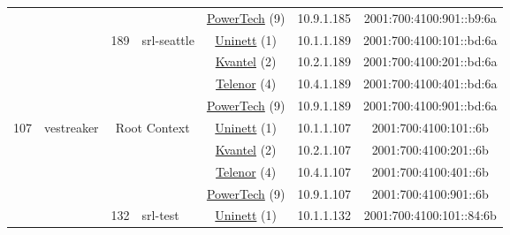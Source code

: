 \begin{small}
\begin{center}
\begin{longtable}{|c|c|c|c|c|c|c|c|}
  &  &  &  & \multicolumn{2}{|c|}{\tiny{\href{http://www.powertech.no}{PowerTech} (9)}} & \tiny{10.9.1.185} & \tiny{2001:700:4100:901::b9:6a} \\* \cline{3-3}\cline{4-4}\cline{5-5}\cline{6-6}\cline{7-7}\cline{8-8}
  &  & \multirow{4}{*}{\tiny{189}} & \multicolumn{1}{|l|}{\multirow{4}{*}{\tiny{srl-seattle}}} & \multicolumn{2}{|c|}{\tiny{\href{https://www.uninett.no}{Uninett} (1)}} & \tiny{10.1.1.189} & \tiny{2001:700:4100:101::bd:6a} \\* \cline{5-5}\cline{6-6}\cline{7-7}\cline{8-8}
  &  &  &  & \multicolumn{2}{|c|}{\tiny{\href{http://kvantel.no}{Kvantel} (2)}} & \tiny{10.2.1.189} & \tiny{2001:700:4100:201::bd:6a} \\* \cline{5-5}\cline{6-6}\cline{7-7}\cline{8-8}
  &  &  &  & \multicolumn{2}{|c|}{\tiny{\href{https://www.telenor.no}{Telenor} (4)}} & \tiny{10.4.1.189} & \tiny{2001:700:4100:401::bd:6a} \\* \cline{5-5}\cline{6-6}\cline{7-7}\cline{8-8}
  &  &  &  & \multicolumn{2}{|c|}{\tiny{\href{http://www.powertech.no}{PowerTech} (9)}} & \tiny{10.9.1.189} & \tiny{2001:700:4100:901::bd:6a} \\ \hline
 \multirow{20}{*}{\tiny{107}} & \multicolumn{1}{|l|}{\multirow{20}{*}{\tiny{vestreaker}}} & \multicolumn{2}{|c|}{\multirow{4}{*}{\tiny{Root Context}}} & \multicolumn{2}{|c|}{\tiny{\href{https://www.uninett.no}{Uninett} (1)}} & \tiny{10.1.1.107} & \tiny{2001:700:4100:101::6b} \\* \cline{5-5}\cline{6-6}\cline{7-7}\cline{8-8}
  &  & \multicolumn{2}{|c|}{} & \multicolumn{2}{|c|}{\tiny{\href{http://kvantel.no}{Kvantel} (2)}} & \tiny{10.2.1.107} & \tiny{2001:700:4100:201::6b} \\* \cline{5-5}\cline{6-6}\cline{7-7}\cline{8-8}
  &  & \multicolumn{2}{|c|}{} & \multicolumn{2}{|c|}{\tiny{\href{https://www.telenor.no}{Telenor} (4)}} & \tiny{10.4.1.107} & \tiny{2001:700:4100:401::6b} \\* \cline{5-5}\cline{6-6}\cline{7-7}\cline{8-8}
  &  & \multicolumn{2}{|c|}{} & \multicolumn{2}{|c|}{\tiny{\href{http://www.powertech.no}{PowerTech} (9)}} & \tiny{10.9.1.107} & \tiny{2001:700:4100:901::6b} \\* \cline{3-3}\cline{4-4}\cline{5-5}\cline{6-6}\cline{7-7}\cline{8-8}
  &  & \multirow{4}{*}{\tiny{132}} & \multicolumn{1}{|l|}{\multirow{4}{*}{\tiny{srl-test}}} & \multicolumn{2}{|c|}{\tiny{\href{https://www.uninett.no}{Uninett} (1)}} & \tiny{10.1.1.132} & \tiny{2001:700:4100:101::84:6b} \\* \cline{5-5}\cline{6-6}\cline{7-7}\cline{8-8}

\end{longtable}
\end{center}
\end{small}
